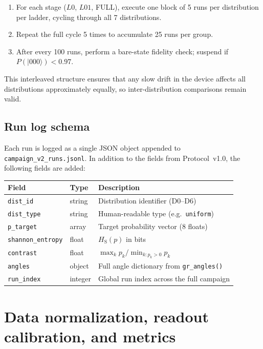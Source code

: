 \documentclass[11pt,a4paper]{article}
\renewcommand{\ket}[1]{|#1\rangle}
\newcommand{\HS}{H_{\mathrm{S}}}
\begin{document}
\begin{enumerate}[label=\arabic*.]
  \item For each stage ($L0$, $L01$, FULL), execute one block of 5 runs
    per distribution per ladder, cycling through all 7 distributions.
  \item Repeat the full cycle 5 times to accumulate 25 runs per group.
  \item After every 100 runs, perform a bare-state fidelity check;
    suspend if $P(\ket{000}) < 0.97$.
\end{enumerate}

This interleaved structure ensures that any slow drift in the
device affects all distributions approximately equally, so
inter-distribution comparisons remain valid.

\subsection{Run log schema}

Each run is logged as a single JSON object appended to
\texttt{campaign\_v2\_runs.jsonl}. In addition to the fields
from Protocol~v1.0, the following fields are added:

\begin{longtable}{lll}
\toprule
Field & Type & Description \\
\midrule
\texttt{dist\_id}     & string  & Distribution identifier (D0--D6) \\
\texttt{dist\_type}   & string  & Human-readable type (e.g.\ \texttt{uniform}) \\
\texttt{p\_target}    & array   & Target probability vector (8 floats) \\
\texttt{shannon\_entropy} & float & $\HS(p)$ in bits \\
\texttt{contrast}     & float   & $\max_k p_k / \min_{k:p_k>0} p_k$ \\
\texttt{angles}       & object  & Full angle dictionary from \texttt{gr\_angles()} \\
\texttt{run\_index}   & integer & Global run index across the full campaign \\
\bottomrule
\end{longtable}

\section{Data normalization, readout calibration, and metrics}
\label{sec:postprocessing}
\end{document}
